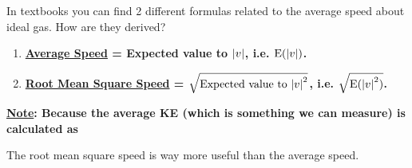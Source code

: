 \documentclass[class=article, crop=false, 12pt]{standalone}
\begin{document}
In textbooks you can find 2 different formulas 
related to the average speed about ideal gas. 
How are they derived?

\begin{enumerate}
    \item \bf{\ul{Average Speed}} = Expected value to $\abs{v}$, i.e. $\E(\abs{v})$.

    \item \bf{\ul{Root Mean Square Speed}} = $\sqrt{\text{Expected value to } \abs{v}^2}$, i.e. $\sqrt{\E(\abs{v}^2)}$.
\end{enumerate}

\bf{\ul{Note}}: Because the average KE
(which is something we can measure)
is calculated as 

The root mean square speed is way more useful than the average speed.

\theend
\end{document}
